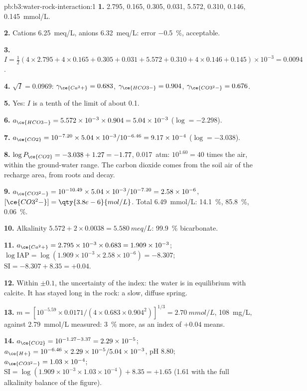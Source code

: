 \begin{solution}{pb:b3:water-rock-interaction:1}
\textbf{1.}  2.795,  0.165,  0.305,  0.031,
 5.572,  0.310,  0.146,  \qty{0.145}{mmol/L}.

\textbf{2.} Cations \qty{6.25}{meq/L}, anions \qty{6.32}{meq/L}: error
\qty{-0.5}{\percent}, acceptable.

\textbf{3.} $I = \tfrac12(4\times2.795 + 4\times0.165 + 0.305 + 0.031 + 5.572
+ 0.310 + 4\times0.146 + 0.145)\times10^{-3} = 0.0094$.

\textbf{4.} $\sqrt I = 0.0969$: $\gamma_{\ce{Ca^2+}} = 0.683$,
$\gamma_{\ce{HCO3-}} = 0.904$, $\gamma_{\ce{CO3^2-}} = 0.676$.

\textbf{5.} Yes: $I$ is a tenth of the limit of about 0.1.

\textbf{6.} $a_{\ce{HCO3-}} = 5.572\times10^{-3}\times0.904 = 5.04\times
10^{-3}$ ($\log = -2.298$).

\textbf{7.} $a_{\ce{CO2}} = 10^{-7.20}\times5.04\times10^{-3}/10^{-6.46} =
9.17\times10^{-4}$ ($\log = -3.038$).

\textbf{8.} $\log P_{\ce{CO2}} = -3.038 + 1.27 = -1.77$, \qty{0.017}{atm}:
$10^{1.60} = 40$ times the air, within the ground-water range. The carbon
dioxide comes from the soil air of the recharge area, from roots and decay.

\textbf{9.} $a_{\ce{CO3^2-}} = 10^{-10.49}\times5.04\times10^{-3}/10^{-7.20}
= 2.58\times10^{-6}$, $[\ce{CO3^2-}] = \qty{3.8e-6}{mol/L}$. Total
\qty{6.49}{mmol/L}:  \qty{14.1}{\percent}, 
\qty{85.8}{\percent},  \qty{0.06}{\percent}.

\textbf{10.} Alkalinity $5.572 + 2\times0.0038 = \qty{5.580}{meq/L}$:
\qty{99.9}{\percent} bicarbonate.

\textbf{11.} $a_{\ce{Ca^2+}} = 2.795\times10^{-3}\times0.683 = 1.909\times
10^{-3}$; $\log\mathrm{IAP} = \log(1.909\times10^{-3}\times2.58\times10^{-6})
= -8.307$; $\mathrm{SI} = -8.307 + 8.35 = +0.04$.

\textbf{12.} Within $\pm0.1$, the uncertainty of the index: the water is in
equilibrium with calcite. It has stayed long in the rock: a slow, diffuse
spring.

\textbf{13.} $m = [10^{-5.59}\times0.0171/(4\times0.683\times0.904^2)]^{1/3}
= \qty{2.70}{mmol/L}$, \qty{108}{mg/L}, against \qty{2.79}{mmol/L} measured:
\qty{3}{\percent} more, as an index of $+0.04$ means.

\textbf{14.} $a_{\ce{CO2}} = 10^{-1.27 - 3.37} = 2.29\times10^{-5}$;
$a_{\ce{H+}} = 10^{-6.46}\times2.29\times10^{-5}/5.04\times10^{-3}$, pH 8.80;
$a_{\ce{CO3^2-}} = 1.03\times10^{-4}$; $\mathrm{SI} = \log(1.909\times
10^{-3}\times1.03\times10^{-4}) + 8.35 = +1.65$ (1.61 with the full
alkalinity balance of the figure).


\end{solution}
